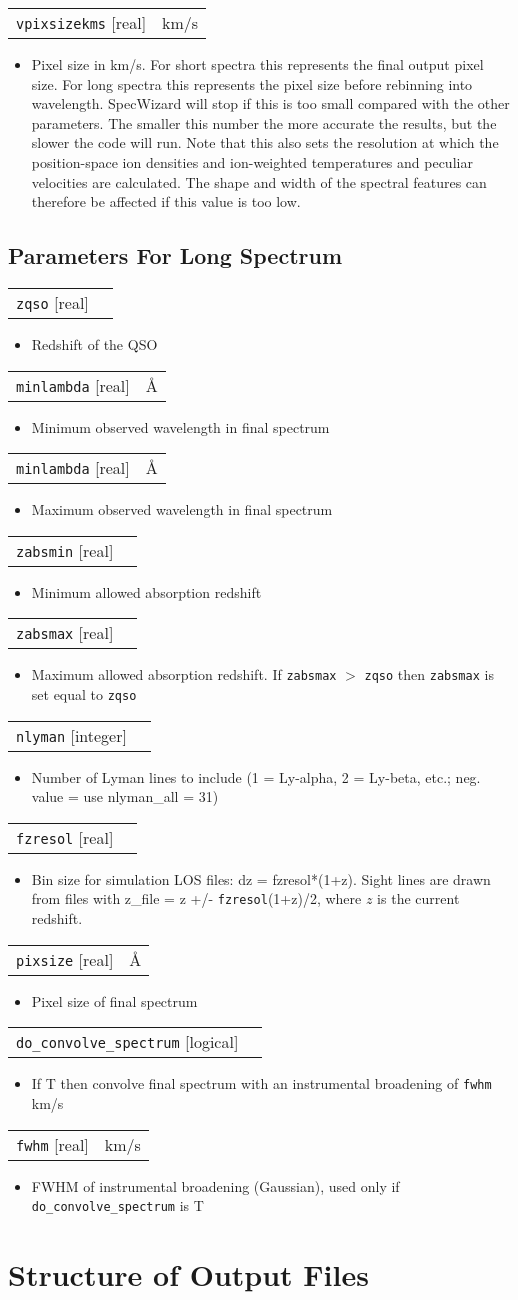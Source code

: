 \documentclass{report}
\makeatletter
\newcommand{\paramdefinition}[3]{
\begin{tabular*}{\textwidth}{l@{\extracolsep{\fill}}r}
		{\tt #1} [{\sc #2}]& #3 \\
\end{tabular*}}
\newcommand{\paramdescription}[1]{
\begin{itemize}
\item #1
\end{itemize}\vspace{0.2cm}}
\makeatother
\begin{document}
\paramdefinition{vpixsizekms}{real}{km/s}
\paramdescription{Pixel size in km/s.  For short spectra this represents the final output pixel size.  For long spectra this represents the pixel size before rebinning into wavelength. SpecWizard will stop if this is too small compared with the other parameters. The smaller this number the more accurate the results, but the slower the code will run. Note that this also sets the resolution at which the position-space ion densities and ion-weighted temperatures and peculiar velocities are calculated. The shape and width of the spectral features can therefore be affected if this value is too low.}

\section{Parameters For Long Spectrum}
\paramdefinition{zqso}{real}{}
\paramdescription{Redshift of the QSO}

\paramdefinition{minlambda}{real}{\AA{}}
\paramdescription{Minimum observed wavelength in final spectrum}

\paramdefinition{minlambda}{real}{\AA{}}
\paramdescription{Maximum observed wavelength in final spectrum}

\paramdefinition{zabsmin}{real}{}
\paramdescription{Minimum allowed absorption redshift}

\paramdefinition{zabsmax}{real}{}
\paramdescription{Maximum allowed absorption redshift.  If {\tt zabsmax} $>$ {\tt zqso} then {\tt zabsmax} is set equal to {\tt zqso}}

\paramdefinition{nlyman}{integer}{}
\paramdescription{Number of Lyman lines to include (1 = Ly-alpha, 2 = Ly-beta, etc.; neg. value = use nlyman\_all = 31)}

\paramdefinition{fzresol}{real}{}
\paramdescription{Bin size for simulation LOS files: dz = fzresol*(1+z). Sight lines are drawn from files with z\_file = z +/- {\tt fzresol}(1+z)/2, where $z$ is the current redshift.}

\paramdefinition{pixsize}{real}{\AA{}}
\paramdescription{Pixel size of final spectrum}

\paramdefinition{do\_convolve\_spectrum}{logical}{}
\paramdescription{If T then convolve final spectrum with an instrumental broadening of {\tt fwhm} km/s}

\paramdefinition{fwhm}{real}{km/s}
\paramdescription{FWHM of instrumental broadening (Gaussian), used only if {\tt do\_convolve\_spectrum} is T}


\chapter{Structure of Output Files}
\end{document}
